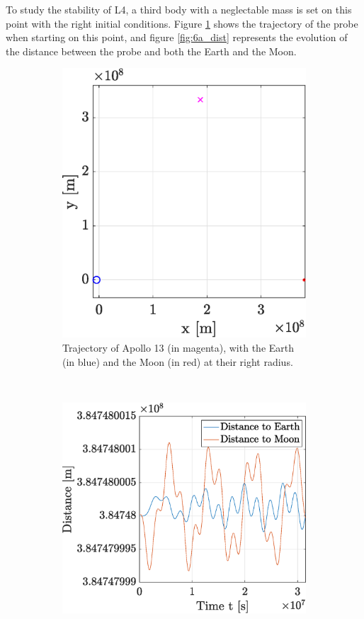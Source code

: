 \documentclass[a4paper,12pt,twoside]{article}
\begin{document}
To study the stability of L4, a third body with a neglectable mass is set on this point with the right initial conditions.
Figure \ref{fig:6a_traj} shows the trajectory of the probe when starting on this point, and figure \ref{fig:6a_dist} represents the evolution of the distance between the probe and both the Earth and the Moon.

\begin{figure}[h]
  \centering
  \begin{subfigure}[t]{0.4\textwidth}
    \includegraphics[width=\textwidth]{graphs/ex6a_traj.eps}
    \caption{Trajectory of Apollo 13 (in magenta), with the Earth (in blue) and the Moon (in red) at their right radius.}
    \label{fig:6a_traj}
  \end{subfigure}
  ~
  \begin{subfigure}[t]{0.55\textwidth}
    \includegraphics[width=\textwidth]{graphs/ex6a_dist.eps}

\end{subfigure}
\end{figure}
\end{document}
